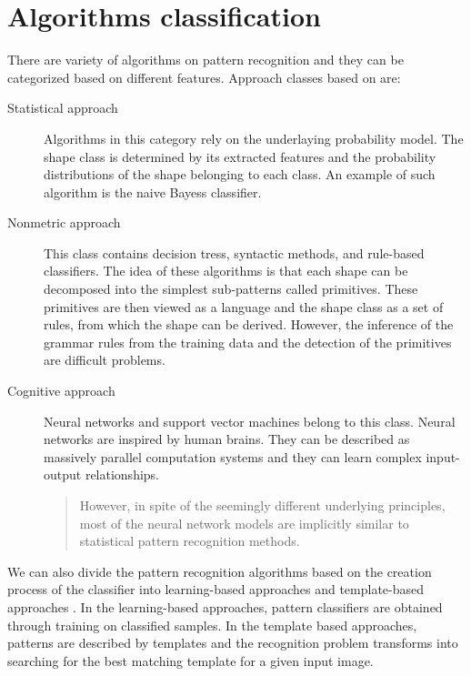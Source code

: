 \section{Algorithms classification}
There are variety of algorithms on pattern recognition and they can be categorized based on different features. Approach classes based on \citet{imageRecognition} are:
\begin{description}
\item [Statistical approach] Algorithms in this category rely on the underlaying probability model. The shape class is determined by its extracted features and the probability distributions of the shape belonging to each class. An example of such algorithm is the naive Bayess classifier.

\item [Nonmetric approach] This class contains decision tress, syntactic methods, and rule-based classifiers. The idea of these algorithms is that each shape can be decomposed into the simplest sub-patterns called primitives. These primitives are then viewed as a language and the shape class as a set of rules, from which the shape can be derived. However, the inference of the grammar rules from the training data and the detection of the primitives are difficult problems.

\item [Cognitive approach] Neural networks and support vector machines belong to this class. Neural networks are inspired by human brains. They can be described as massively parallel computation systems and they can learn complex input-output relationships. \begin{quotation} However, in spite of the seemingly different underlying principles, most of the neural network models are implicitly similar to statistical pattern recognition methods. \end{quotation} \cite{imageRecognition}

\end{description}

We can also divide the pattern recognition algorithms based on the creation process of the classifier into learning-based approaches and template-based approaches \cite{skeletonMatching}. In the learning-based approaches, pattern classifiers are obtained through training on classified samples. In the template based approaches, patterns are described by templates and the recognition problem transforms into searching for the best matching template for a given input image.


